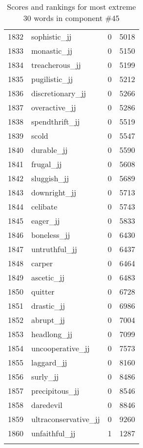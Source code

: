 \begin{longtable}[!htbp]{| rlr@{.}l |}
    1832 & sophistic\_jj & 0 & 5018 \\
    1833 & monastic\_jj & 0 & 5150 \\
    1834 & treacherous\_jj & 0 & 5199 \\
    1835 & pugilistic\_jj & 0 & 5212 \\
    1836 & discretionary\_jj & 0 & 5266 \\
    1837 & overactive\_jj & 0 & 5286 \\
    1838 & spendthrift\_jj & 0 & 5519 \\
    1839 & scold & 0 & 5547 \\
    1840 & durable\_jj & 0 & 5590 \\
    1841 & frugal\_jj & 0 & 5608 \\
    1842 & sluggish\_jj & 0 & 5689 \\
    1843 & downright\_jj & 0 & 5713 \\
    1844 & celibate & 0 & 5743 \\
    1845 & eager\_jj & 0 & 5833 \\
    1846 & boneless\_jj & 0 & 6430 \\
    1847 & untruthful\_jj & 0 & 6437 \\
    1848 & carper & 0 & 6464 \\
    1849 & ascetic\_jj & 0 & 6483 \\
    1850 & quitter & 0 & 6728 \\
    1851 & drastic\_jj & 0 & 6986 \\
    1852 & abrupt\_jj & 0 & 7004 \\
    1853 & headlong\_jj & 0 & 7099 \\
    1854 & uncooperative\_jj & 0 & 7573 \\
    1855 & laggard\_jj & 0 & 8160 \\
    1856 & surly\_jj & 0 & 8486 \\
    1857 & precipitous\_jj & 0 & 8546 \\
    1858 & daredevil & 0 & 8846 \\
    1859 & ultraconservative\_jj & 0 & 9260 \\
    1860 & unfaithful\_jj & 1 & 1287 \\
    \hline
    \caption{Scores and rankings for most extreme 30 words in component \#45} \\
\end{longtable}
